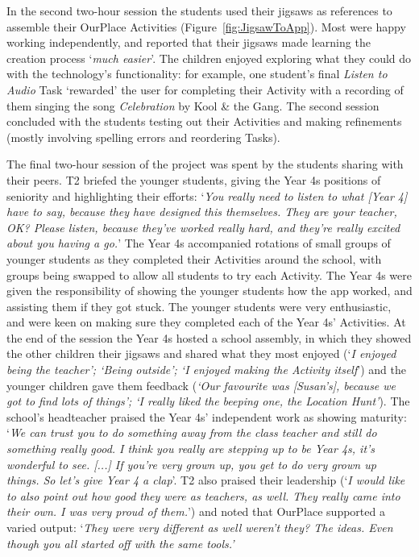 \documentclass[,hyphens]{sigchi}
\begin{document}
In the second two-hour session the students used their jigsaws as references to assemble their OurPlace Activities (Figure~\ref{fig:JigsawToApp}). Most were happy working independently, and reported that their jigsaws made learning the creation process `\textit{much easier}'. The children enjoyed exploring what they could do with the technology's functionality: for example, one student's final \textit{Listen to Audio} Task `rewarded' the user for completing their Activity with a recording of them singing the song \textit{Celebration} by Kool \& the Gang. The second session concluded with the students testing out their Activities and making refinements (mostly involving spelling errors and reordering Tasks). 

The final two-hour session of the project was spent by the students sharing with their peers. T2 briefed the younger students, giving the Year 4s positions of seniority and highlighting their efforts: `\textit{You really need to listen to what [Year 4] have to say, because they have designed this themselves. They are your teacher, OK? Please listen, because they've worked really hard, and they're really excited about you having a go.}' The Year 4s accompanied rotations of small groups of younger students as they completed their Activities around the school, with groups being swapped to allow all students to try each Activity. The Year 4s were given the responsibility of showing the younger students how the app worked, and assisting them if they got stuck. The younger students were very enthusiastic, and were keen on making sure they completed each of the Year 4s' Activities. At the end of the session the Year 4s hosted a school assembly, in which they showed the other children their jigsaws and shared what they most enjoyed (`\textit{I enjoyed being the teacher'; `Being outside'; `I enjoyed making the Activity itself}') and the younger children gave them feedback (\textit{`Our favourite was [Susan's], because we got to find lots of things'; `I really liked the beeping one, the Location Hunt'}). The school's headteacher praised the Year 4s' independent work as showing maturity: `\textit{We can trust you to do something away from the class teacher and still do something really good. I think you really are stepping up to be Year 4s, it's wonderful to see. [...] If you're very grown up, you get to do very grown up things. So let's give Year 4 a clap}'. T2 also praised their leadership (`\textit{I would like to also point out how good they were as teachers, as well. They really came into their own. I was very proud of them.}') and noted that OurPlace supported a varied output: `\textit{They were very different as well weren't they? The ideas. Even though you all started off with the same tools.'}
\end{document}
